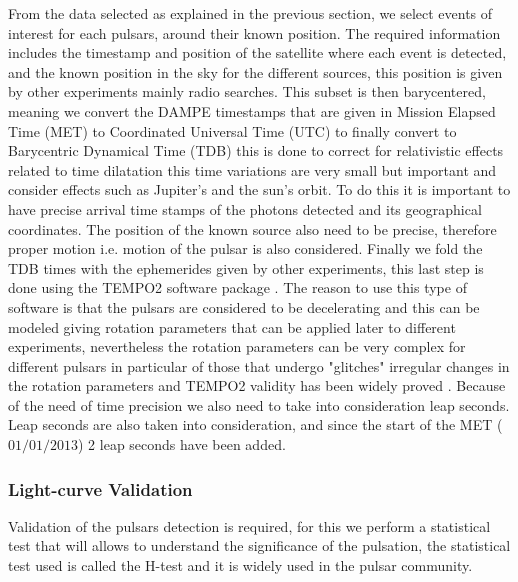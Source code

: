 \documentclass{PoS}
\begin{document}
From the data selected as explained in the previous section, we select events of interest for each pulsars, around their known position. The required information includes the timestamp and position of the satellite where each event is detected, and the known position in the sky for the different sources, this position is given by other experiments mainly radio searches.
This subset is then barycentered, meaning we convert the DAMPE timestamps that are given in Mission Elapsed Time (MET) to Coordinated Universal Time (UTC) to finally convert to Barycentric Dynamical Time (TDB) this is done to correct for relativistic effects related  to  time dilatation this time variations are very small but important and consider effects such as Jupiter's and the sun's orbit. To do this it is important  to have precise arrival time stamps of the photons detected and its geographical coordinates. The position of the known source also need to be precise, therefore proper motion i.e. motion of the pulsar is also considered.
Finally we  fold the TDB times with the ephemerides given by other experiments, this last step is done using the TEMPO2 software package \cite{tempo2}.   The reason to use this  type of software is that the pulsars are considered to be decelerating and this can be modeled giving rotation parameters that can be applied later  to different experiments, nevertheless the  rotation parameters can be very complex for different  pulsars in particular of those that undergo "glitches" irregular changes in the rotation parameters and TEMPO2 validity has been widely proved \cite{2catalogfermi} \cite{geminga_fermi}. Because of the need of time precision we also need to take into consideration leap seconds. Leap seconds are also taken into consideration, and since the start of the MET ($01/01/2013$) 2 leap seconds have been added.



\subsubsection{Light-curve Validation}
Validation of the pulsars detection is required, for this we perform a statistical test that will  allows to understand the significance of  the pulsation, the statistical test used is called the H-test and it is widely used in the pulsar community.
\end{document}
